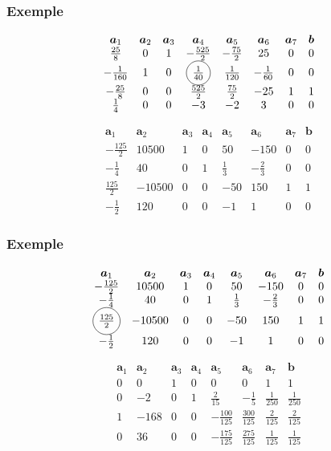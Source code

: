 \documentclass[t,usepdftitle=false]{beamer}
\newcommand*\circled[1]{\tikz[baseline=(char.base)]{
    \node[shape=circle,draw,inner sep=2pt] (char) {#1};}}
\def\ba{\boldsymbol{a}}
\def\bb{\boldsymbol{b}}
\begin{document}
\begin{frame}
	\frametitle{Exemple}
	
	\[
	\begin{matrix}
		\ba_1 & \ba_2 & \ba_3 & \ba_4 & \ba_5 &\ba_6 &\ba_7 & \bb \\
		\frac{25}{8} & 0 & 1 & -\frac{525}{2} & -\frac{75}{2} & 25 & 0 & 0 \\
		-\frac{1}{160} & 1 & 0 & \circled{$\frac{1}{40}$} & \frac{1}{120} & -\frac{1}{60} & 0 & 0 \\
		-\frac{25}{8} & 0 & 0 & \frac{525}{2} & \frac{75}{2} & -25 & 1 & 1 \\
		\frac{1}{4} & 0 & 0 & -3 & -2 & 3 & 0 & 0
	\end{matrix}
	\]
	
	\[
	\begin{matrix}
		\ba_1 & \ba_2 & \ba_3 & \ba_4 & \ba_5 &\ba_6 &\ba_7 & \bb \\
		-\frac{125}{2} & 10500 & 1 & 0 & 50 & -150 & 0 & 0 \\
		-\frac{1}{4} & 40 & 0 & 1 & \frac{1}{3} & -\frac{2}{3} & 0 & 0 \\
		\frac{125}{2} & -10500 & 0 & 0 & -50 & 150 & 1 & 1 \\
		-\frac{1}{2} & 120 & 0 & 0 & -1 & 1 & 0 & 0
	\end{matrix}
	\]
	
\end{frame}

\begin{frame}
	\frametitle{Exemple}
	
	\[
	\begin{matrix}
		\ba_1 & \ba_2 & \ba_3 & \ba_4 & \ba_5 &\ba_6 &\ba_7 & \bb \\
		-\frac{125}{2} & 10500 & 1 & 0 & 50 & -150 & 0 & 0 \\
		-\frac{1}{4} & 40 & 0 & 1 & \frac{1}{3} & -\frac{2}{3} & 0 & 0 \\
		\circled{$\frac{125}{2}$} & -10500 & 0 & 0 & -50 & 150 & 1 & 1 \\
		-\frac{1}{2} & 120 & 0 & 0 & -1 & 1 & 0 & 0
	\end{matrix}
	\]
	
	\[
	\begin{matrix}
		\ba_1 & \ba_2 & \ba_3 & \ba_4 & \ba_5 &\ba_6 &\ba_7 & \bb \\
		0 & 0 & 1 & 0 & 0 & 0 & 1 & 1 \\
		0 & -2 & 0 & 1 & \frac{2}{15} & -\frac{1}{5} & \frac{1}{250} & \frac{1}{250} \\
		1 & -168 & 0 & 0 & -\frac{100}{125} & \frac{300}{125} & \frac{2}{125} & \frac{2}{125} \\
		0 & 36 & 0 & 0 & -\frac{175}{125} & \frac{275}{125} & \frac{1}{125} & \frac{1}{125}
	\end{matrix}
	\]
	
\end{frame}
\end{document}

